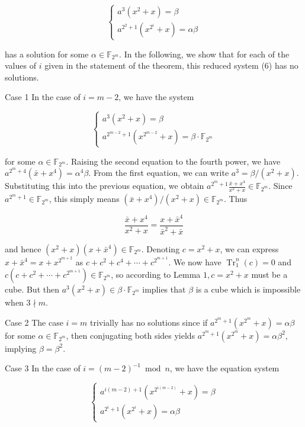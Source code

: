 \documentclass[10pt]{article}
\begin{document}
\[
\left\{\begin{array}{l}
a^{3}\left(x^{2}+x\right)=\beta  \tag{6}\\
a^{2^{2}+1}\left(x^{2^{i}}+x\right)=\alpha \beta
\end{array}\right.
\]

has a solution for some $\alpha \in \mathbb{F}_{2^{m}}$. In the following, we show that for each of the values of $i$ given in the statement of the theorem, this reduced system (6) has no solutions.

Case 1 In the case of $i=m-2$, we have the system

$$
\left\{\begin{array}{l}
a^{3}\left(x^{2}+x\right)=\beta \\
a^{2^{m-2}+1}\left(x^{2^{m-2}}+x\right)=\beta \cdot \mathbb{F}_{2^{m}}
\end{array}\right.
$$

for some $\alpha \in \mathbb{F}_{2^{m}}$. Raising the second equation to the fourth power, we have $a^{2^{m}+4}\left(\bar{x}+x^{4}\right)=\alpha^{4} \beta$. From the first equation, we can write $a^{3}=\beta /\left(x^{2}+x\right)$. Substituting this into the previous equation, we obtain $a^{2^{m}+1} \frac{\bar{x}+x^{4}}{x^{2}+x} \in \mathbb{F}_{2^{m}}$. Since $a^{2^{m}+1} \in \mathbb{F}_{2^{m}}$, this simply means $\left(\bar{x}+x^{4}\right) /\left(x^{2}+x\right) \in \mathbb{F}_{2^{m}}$. Thus

$$
\frac{\bar{x}+x^{4}}{x^{2}+x}=\frac{x+\bar{x}^{4}}{\bar{x}^{2}+\bar{x}}
$$

and hence $\left(x^{2}+x\right)\left(x+\bar{x}^{4}\right) \in \mathbb{F}_{2^{m}}$. Denoting $c=x^{2}+x$, we can express $x+\bar{x}^{4}=x+x^{2^{m+2}}$ as $c+c^{2}+c^{4}+\cdots+c^{2^{m+1}}$. We now have $\operatorname{Tr}_{1}^{n}(c)=0$ and $c\left(c+c^{2}+\cdots+c^{2^{m+1}}\right) \in \mathbb{F}_{2^{m}}$, so according to Lemma $1, c=x^{2}+x$ must be a cube. But then $a^{3}\left(x^{2}+x\right) \in \beta \cdot \mathbb{F}_{2^{m}}$ implies that $\beta$ is a cube which is impossible when $3 \nmid m$.

Case 2 The case $i=m$ trivially has no solutions since if $a^{2^{m}+1}\left(x^{2^{m}}+x\right)=\alpha \beta$ for some $\alpha \in \mathbb{F}_{2^{m}}$, then conjugating both sides yields $a^{2^{m}+1}\left(x^{2^{m}}+x\right)=\alpha \beta^{2}$, implying $\beta=\beta^{2}$.

Case 3 In the case of $i=(m-2)^{-1} \bmod n$, we have the equation system

\[
\left\{\begin{array}{l}
a^{i(m-2)+1}\left(x^{2^{i(m-2)}}+x\right)=\beta  \tag{7}\\
a^{2^{i}+1}\left(x^{2^{i}}+x\right)=\alpha \beta
\end{array}\right.
\]
\end{document}
